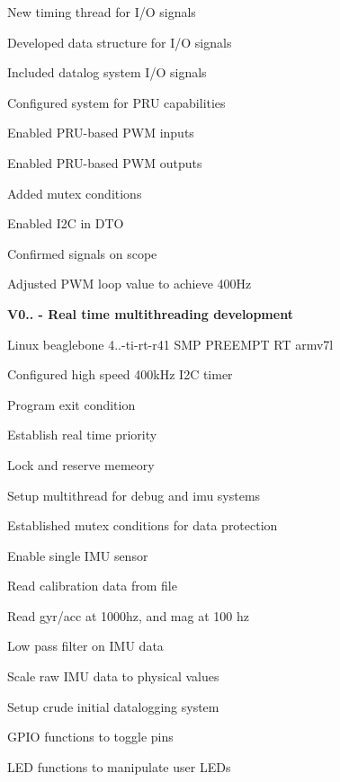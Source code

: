 \begin{DoxyItemize}
\begin{DoxyItemize}
\item New timing thread for I/O signals  
\item Developed data structure for I/O signals  
\item Included datalog system I/O signals  
\item Configured system for P\+RU capabilities  
\item Enabled P\+R\+U-\/based P\+WM inputs  
\item Enabled P\+R\+U-\/based P\+WM outputs  
\item Added mutex conditions  
\item Enabled I2C in D\+TO  
\item Confirmed signals on scope  
\item Adjusted P\+WM loop value to achieve 400\+Hz  
\end{DoxyItemize}
\item {\bfseries  V0.. -\/ Real time multithreading development } 
\begin{DoxyItemize}
\item Linux beaglebone 4..-\/ti-\/rt-\/r41 S\+MP P\+R\+E\+E\+M\+PT RT armv7l  
\item Configured high speed 400k\+Hz I2C timer  
\item Program exit condition  
\item Establish real time priority  
\item Lock and reserve memeory  
\item Setup multithread for \textquotesingle{}debug\textquotesingle{} and \textquotesingle{}imu\textquotesingle{} systems  
\item Established mutex conditions for data protection  
\item Enable single I\+MU sensor  
\item Read calibration data from file  
\item Read gyr/acc at 1000hz, and mag at 100 hz  
\item Low pass filter on I\+MU data  
\item Scale raw I\+MU data to physical values  
\item Setup crude initial datalogging system  
\item G\+P\+IO functions to toggle pins  
\item L\+ED functions to manipulate user L\+E\+Ds  
\end{DoxyItemize}
\end{DoxyItemize}

